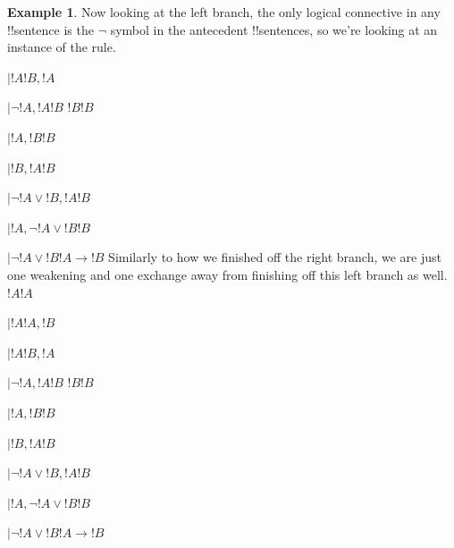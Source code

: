 \documentclass[10pt,a4paper]{article}
\theoremstyle{plain}
\theoremstyle{definition}
\newtheorem{ex}[thm]{Example}
\theoremstyle{remark}
\providecommand{\AxiomC}[1]{}
\providecommand{\RightLabel}[1]{}
\providecommand{\fCenter}{}
\newenvironment{prooftree}{}{}
\providecommand{\lif}{\mathbin{\rightarrow}}
\providecommand{\LeftR}[1]{}
\providecommand{\RightR}[1]{}
\providecommand{\UnaryInf}{\ensuremath{\mid}}
\providecommand{\BinaryInf}{\ensuremath{\mid}}
\providecommand{\Weakening}{\mathrm{Wk}}
\providecommand{\RightR}{\mathrm{R}}
\providecommand{\LeftR}{\mathrm{L}}
\providecommand{\Axiom}{\mathrm{Ax}}
\begin{document}
\begin{ex}
Now looking at the left branch, the only logical connective in any
!!{sentence} is the $\lnot$ symbol in the antecedent !!{sentence}s, so
we're looking at an instance of the \LeftR{\lnot} rule.
\begin{prooftree}
\AxiomC{}
\UnaryInf$ !A \fCenter !B, !A$
\RightLabel{\LeftR{\lnot}}
\UnaryInf$\lnot !A, !A \fCenter !B$
\Axiom$!B \fCenter !B$
\RightLabel{\LeftR{\Weakening}}
\UnaryInf$!A, !B \fCenter !B$
\RightLabel{\LeftR{\Exchange}}
\UnaryInf$!B, !A \fCenter !B$
\RightLabel{\LeftR{\lor}}
\BinaryInf$\lnot !A \lor !B, !A \fCenter !B $
\RightLabel{\RightR{\Exchange}}
\UnaryInf$ !A, \lnot !A \lor !B \fCenter !B $
\RightLabel{\RightR{\lif}}
\UnaryInf$ \lnot !A \lor !B \fCenter !A \lif !B $
\end{prooftree}
Similarly to how we finished off the right branch, we are just one
weakening and one exchange away from finishing off this left branch as well.
\begin{prooftree}
\Axiom$!A \fCenter !A$
\RightLabel{\RightR{\Weakening}}
\UnaryInf$ !A \fCenter !A, !B$
\RightLabel{\RightR{\Exchange}}
\UnaryInf$ !A \fCenter !B, !A$
\RightLabel{\LeftR{\lnot}}
\UnaryInf$\lnot !A, !A \fCenter !B$
\Axiom$!B \fCenter !B$
\RightLabel{\LeftR{\Weakening}}
\UnaryInf$!A, !B \fCenter !B$
\RightLabel{\LeftR{\Exchange}}
\UnaryInf$!B, !A \fCenter !B$
\RightLabel{\LeftR{\lor}}
\BinaryInf$\lnot !A \lor !B, !A \fCenter !B $
\RightLabel{\RightR{\Exchange}}
\UnaryInf$ !A, \lnot !A \lor !B \fCenter !B $
\RightLabel{\RightR{\lif}}
\UnaryInf$ \lnot !A \lor !B \fCenter !A \lif !B $
\end{prooftree}
\end{ex}
\end{document}
